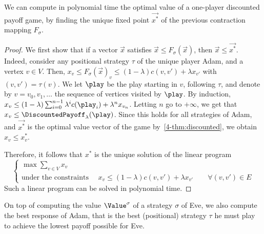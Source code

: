 \begin{proposition}\label{4-lem:one-player-DP}
  We can compute in polynomial time the optimal value of a one-player
  discounted payoff game, by finding the unique fixed point
  $\vec{x^*}$ of the previous contraction mapping $F_\sigma$.
\end{proposition}
\begin{proof}
  We first show that if a vector $\vec x$ satisfies
  $\vec x\leq F_\sigma(\vec x)$, then $\vec x\leq \vec{x^*}$. Indeed,
  consider any positional strategy $\tau$ of the unique player Adam,
  and a vertex $v\in V$. Then,
  $x_v\leq F_\sigma(\vec x)_v\leq (1-\lambda)c(v,v')+\lambda x_{v'}$ with
  $(v,v')=\tau(v)$. We let $\play$ be the play starting in $v$, following
  $\tau$, and denote by $v=v_0,v_1,\ldots$ the sequence of vertices
  visited by $\play$. By induction,
  $x_v \leq (1-\lambda)\sum_{i=0}^{n-1}\lambda^i c(\play_i) +
  \lambda^nx_{v_n}$. Letting $n$ go to $+\infty$, we get that
  $x_v\leq \DiscountedPayoff_\lambda(\play)$. Since this holds for all
  strategies of Adam, and $\vec{x^*}$ is the optimal value vector of the
  game by~\cref{4-thm:discounted}, we obtain $x_v\leq x^*_v$.

  Therefore, it follows that $x^*$ is the unique solution of the
  linear program
  \[
    \begin{cases}
      \max\sum_{v\in V}x_v \\
      \text{under the constraints }\quad x_v\leq
      (1-\lambda)c(v,v')+\lambda x_{v'}\qquad \forall (v,v')\in E
    \end{cases}\]
  Such a linear program can be solved in polynomial time. 
\end{proof}

On top of computing the value $\Value^\sigma$ of a strategy $\sigma$
of Eve, we also compute the best response of Adam, that is the best
(positional) strategy $\tau$ he must play to achieve the lowest payoff
possible for Eve.

